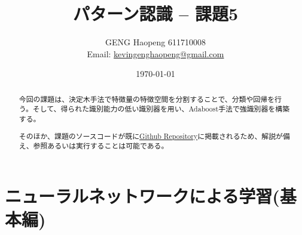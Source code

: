 \documentclass[ %
  uplatex,%
  papersize%
]{jsarticle}
\title{パターン認識 -- 課題5}
\author{\large GENG Haopeng 611710008 \\ \small Email:  \href{mailto:kevingenghaopeng@gmail.com}{kevingenghaopeng@gmail.com}}
\affil{\small Department of Intelligent Systems, Nagoya University}
\date{\today}
\begin{document}
\maketitle

\begin{abstract}
今回の課題は、決定木手法で特徴量の特徴空間を分割することで、分類や回帰を行う。そして、得られた識別能力の低い識別器を用い、Adaboost手法で強識別器を構築する。

そのほか、課題のソースコードが既に\href{https://github.com/Secondtonumb/pattern_recogn/tree/master/pattern04}{Github Repository}に掲載されるため、解説が備え、参照あるいは実行することは可能である。
\end{abstract}

\section{ニューラルネットワークによる学習(基本編)}
\end{document}
